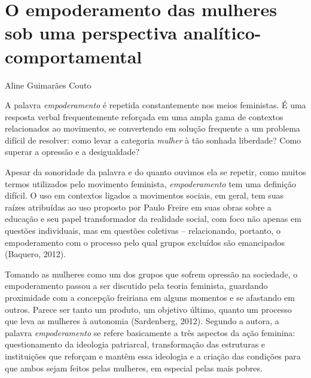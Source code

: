 \chapter{O empoderamento das mulheres sob uma perspectiva analítico-comportamental}
\begin{flushright}
\begin{scriptsize}
    Aline Guimarães Couto
\end{scriptsize}
\vspace{1cm}
\end{flushright}

A palavra \textit{empoderamento} é repetida constantemente nos meios feministas. É uma resposta verbal frequentemente reforçada em uma ampla gama de contextos relacionados ao movimento, se convertendo em solução frequente a um problema difícil de resolver: como levar a categoria \textit{mulher} à tão sonhada liberdade? Como superar a opressão e a desigualdade?

Apesar da sonoridade da palavra e do quanto ouvimos ela se repetir, como muitos termos utilizados pelo movimento feminista, \textit{empoderamento} tem uma definição difícil. O uso em contextos ligados a movimentos sociais, em geral, tem suas raízes atribuídas ao uso proposto por Paulo Freire em suas obras sobre a educação e seu papel transformador da realidade social, com foco não apenas em questões individuais, mas em questões coletivas – relacionando, portanto, o empoderamento com o processo pelo qual grupos excluídos são emancipados (Baquero, 2012).

Tomando as mulheres como um dos grupos que sofrem opressão na sociedade, o empoderamento passou a ser discutido pela teoria feminista, guardando proximidade com a concepção freiriana em alguns momentos e se afastando em outros. Parece ser tanto um produto, um objetivo último, quanto um processo que leva as mulheres à autonomia (Sardenberg, 2012). Segundo a autora, a palavra \textit{empoderamento} se refere basicamente a três aspectos da ação feminina: questionamento da ideologia patriarcal, transformação das estruturas e instituições que reforçam e mantêm essa ideologia e a criação das condições para que ambos sejam feitos pelas mulheres, em especial pelas mais pobres. 


